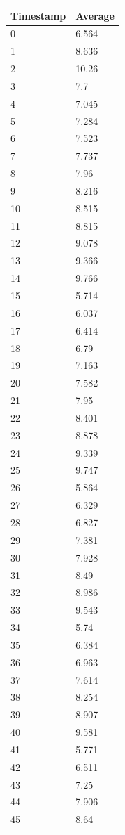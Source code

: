 %
%
\begin{tabular}{|l||l|}
\hline
	\textbf{Timestamp} & \textbf{Average} \\ \hline
	0 & 6.564 \\ \hline
	1 & 8.636 \\ \hline
	2 & 10.26 \\ \hline
	3 & 7.7 \\ \hline
	4 & 7.045 \\ \hline
	5 & 7.284 \\ \hline
	6 & 7.523 \\ \hline
	7 & 7.737 \\ \hline
	8 & 7.96 \\ \hline
	9 & 8.216 \\ \hline
	10 & 8.515 \\ \hline
	11 & 8.815 \\ \hline
	12 & 9.078 \\ \hline
	13 & 9.366 \\ \hline
	14 & 9.766 \\ \hline
	15 & 5.714 \\ \hline
	16 & 6.037 \\ \hline
	17 & 6.414 \\ \hline
	18 & 6.79 \\ \hline
	19 & 7.163 \\ \hline
	20 & 7.582 \\ \hline
	21 & 7.95 \\ \hline
	22 & 8.401 \\ \hline
	23 & 8.878 \\ \hline
	24 & 9.339 \\ \hline
	25 & 9.747 \\ \hline
	26 & 5.864 \\ \hline
	27 & 6.329 \\ \hline
	28 & 6.827 \\ \hline
	29 & 7.381 \\ \hline
	30 & 7.928 \\ \hline
	31 & 8.49 \\ \hline
	32 & 8.986 \\ \hline
	33 & 9.543 \\ \hline
	34 & 5.74 \\ \hline
	35 & 6.384 \\ \hline
	36 & 6.963 \\ \hline
	37 & 7.614 \\ \hline
	38 & 8.254 \\ \hline
	39 & 8.907 \\ \hline
	40 & 9.581 \\ \hline
	41 & 5.771 \\ \hline
	42 & 6.511 \\ \hline
	43 & 7.25 \\ \hline
	44 & 7.906 \\ \hline
	45 & 8.64 \\ \hline
\end{tabular}
